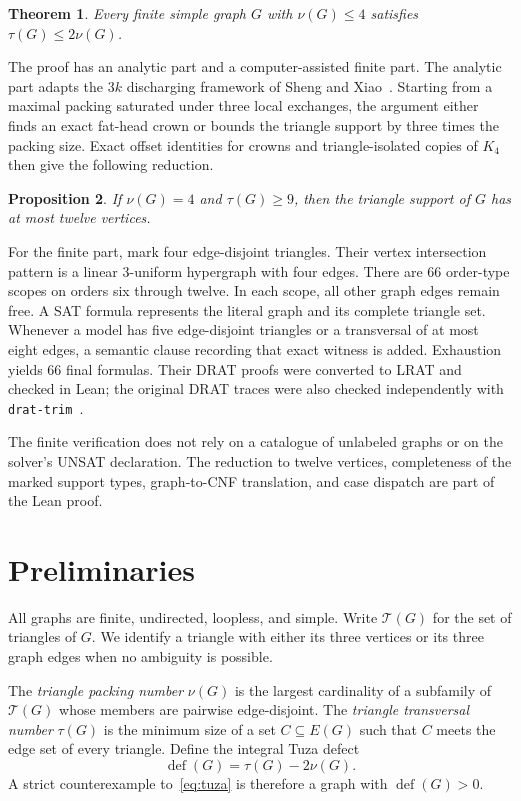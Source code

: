 \documentclass[11pt]{article}
\newtheorem{theorem}{Theorem}[section]
\newtheorem{proposition}[theorem]{Proposition}
\theoremstyle{definition}
\newcommand{\Tcal}{\mathcal{T}}
\newcommand{\defect}{\operatorname{def}}
\begin{document}
\begin{theorem}\label{thm:main}
Every finite simple graph $G$ with $\nu(G)\leq 4$ satisfies
$\tau(G)\leq 2\nu(G)$.
\end{theorem}

The proof has an analytic part and a computer-assisted finite part.  The analytic
part adapts the $3k$ discharging framework of Sheng and
Xiao~\cite{ShengXiao2024}.  Starting from a maximal packing saturated under
three local exchanges, the argument either finds an exact fat-head crown or
bounds the triangle support by three times the packing size.  Exact offset
identities for crowns and triangle-isolated copies of $K_4$ then give the
following reduction.

\begin{proposition}\label{prop:twelve}
If $\nu(G)=4$ and $\tau(G)\geq 9$, then the triangle support of $G$ has at
most twelve vertices.
\end{proposition}

For the finite part, mark four edge-disjoint triangles.  Their vertex
intersection pattern is a linear $3$-uniform hypergraph with four edges.
There are 66 order-type scopes on orders six through twelve.  In each scope,
all other graph edges remain free.  A SAT formula represents the literal graph
and its complete triangle set.  Whenever a model has five edge-disjoint
triangles or a transversal of at most eight edges, a semantic clause recording
that exact witness is added.  Exhaustion yields 66 final formulas.  Their DRAT
proofs were converted to LRAT and checked in Lean; the original DRAT traces
were also checked independently with
\texttt{drat-trim}~\cite{HeuleWetzlerHunt2014}.

The finite verification does not rely on a catalogue of unlabeled graphs or
on the solver's UNSAT declaration.  The reduction to twelve vertices,
completeness of the marked support types, graph-to-CNF translation, and case
dispatch are part of the Lean proof.

\section{Preliminaries}

All graphs are finite, undirected, loopless, and simple.  Write $\Tcal(G)$
for the set of triangles of $G$.  We identify a triangle with either its
three vertices or its three graph edges when no ambiguity is possible.

The \emph{triangle packing number} $\nu(G)$ is the largest cardinality of a
subfamily of $\Tcal(G)$ whose members are pairwise edge-disjoint.  The
\emph{triangle transversal number} $\tau(G)$ is the minimum size of a set
$C\subseteq E(G)$ such that $C$ meets the edge set of every triangle.
Define the integral Tuza defect
\[
  \defect(G)=\tau(G)-2\nu(G).
\]
A strict counterexample to~\eqref{eq:tuza} is therefore a graph with
$\defect(G)>0$.
\end{document}
